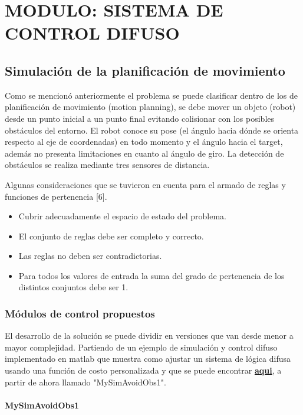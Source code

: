 \section{MODULO: SISTEMA DE CONTROL DIFUSO}

\subsection{Simulación de la planificación de movimiento}

Como se mencionó anteriormente el problema se puede clasificar dentro de los de planificación de movimiento (motion planning), se debe mover un objeto (robot) desde un punto inicial a un punto final evitando colisionar con los posibles obstáculos del entorno. El robot conoce su pose (el ángulo hacia dónde se orienta respecto al eje de coordenadas) en todo momento y el ángulo hacia el target, además no presenta limitaciones en cuanto al ángulo de giro. La detección de obstáculos se realiza mediante tres sensores de distancia.

Algunas consideraciones que se tuvieron en cuenta para el armado de reglas y funciones de pertenencia [6].

\begin{itemize}
    \item Cubrir adecuadamente el espacio de estado del problema.
    \item El conjunto de reglas debe ser completo y correcto.
    \item Las reglas no deben ser contradictorias.
    \item Para todos los valores de entrada la suma del grado de pertenencia de los distintos conjuntos debe ser 1.
\end{itemize}

\subsubsection{Módulos de control propuestos}

El desarrollo de la solución se puede dividir en versiones que van desde menor a mayor complejidad. Partiendo de un ejemplo de simulación y control difuso implementado en matlab que muestra como ajustar un sistema de lógica difusa usando una función de costo personalizada y que se puede encontrar \href{https://www.mathworks.com/help/fuzzy/tune-fuzzy-systems-using-custom-cost-function.html}{\textbf{aqui}}, a partir de ahora llamado "MySimAvoidObs1".

\paragraph{MySimAvoidObs1}\mbox{}\\

